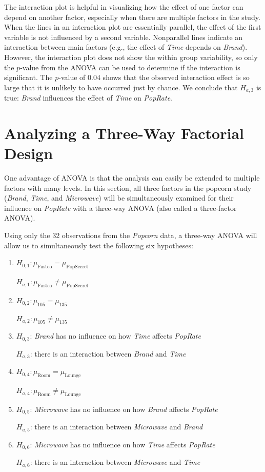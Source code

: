 \documentclass[
]{report}
\begin{document}
The interaction plot is helpful in visualizing how the effect of one factor can depend on another factor, especially when there are multiple factors in the study. When the lines in an interaction plot are essentially parallel, the effect of the first variable is not influenced by a second variable. Nonparallel lines indicate an interaction between main factors (e.g., the effect of \emph{Time} depends on \emph{Brand}). However, the interaction plot does not show the within group variability, so only the \(p\)-value from the ANOVA can be used to determine if the interaction is significant. The \(p\)-value of 0.04 shows that the observed interaction effect is so large that it is unlikely to have occurred just by chance. We conclude that \(H_{a,3}\) is true: \emph{Brand} influences the effect of \emph{Time} on \emph{PopRate}.

\section{\texorpdfstring{\textbf{Analyzing a Three-Way Factorial Design}}{Analyzing a Three-Way Factorial Design}}\label{analyzing-a-three-way-factorial-design}

One advantage of ANOVA is that the analysis can easily be extended to multiple factors with many levels. In this section, all three factors in the popcorn study (\emph{Brand}, \emph{Time}, and \emph{Microwave}) will be simultaneously examined for their influence on \emph{PopRate} with a three-way ANOVA (also called a three-factor ANOVA).

Using only the 32 observations from the \emph{Popcorn} data, a three-way ANOVA will allow us to simultaneously test the following six hypotheses:

\begin{enumerate}
\def\labelenumi{\arabic{enumi}.}
\item
  \(H_{0,1}: \mu_{\text{Fastco}} = \mu_{\text{PopSecret}}\)

  \(H_{a,1}: \mu_{\text{Fastco}} \ne \mu_{\text{PopSecret}}\)
\item
  \(H_{0,2}: \mu_{105} = \mu_{135}\)

  \(H_{a,2}: \mu_{105} \ne \mu_{135}\)
\item
  \(H_{0,3}\): \emph{Brand} has no influence on how \emph{Time} affects \emph{PopRate}

  \(H_{a,3}\): there is an interaction between \emph{Brand} and \emph{Time}
\item
  \(H_{0,4}: \mu_{\text{Room}} = \mu_{\text{Lounge}}\)

  \(H_{a,4}: \mu_{\text{Room}} \ne \mu_{\text{Lounge}}\)
\item
  \(H_{0,5}\): \emph{Microwave} has no influence on how \emph{Brand} affects \emph{PopRate}

  \(H_{a,5}\): there is an interaction between \emph{Microwave} and \emph{Brand}
\item
  \(H_{0,6}\): \emph{Microwave} has no influence on how \emph{Time} affects \emph{PopRate}

  \(H_{a,6}\): there is an interaction between \emph{Microwave} and \emph{Time}
\end{enumerate}
\end{document}
